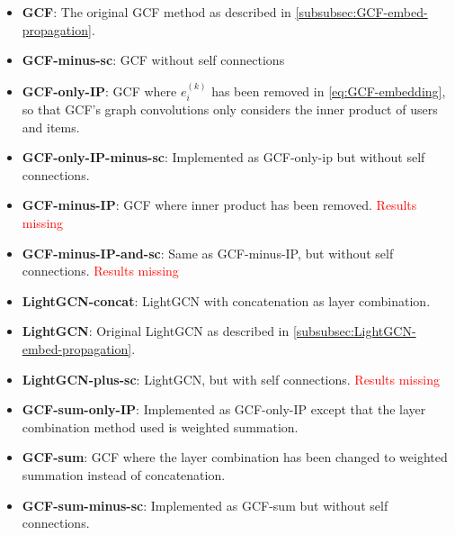 \begin{itemize}
    \item \textbf{GCF}: The original GCF method as described in \autoref{subsubsec:GCF-embed-propagation}.
    \item \textbf{GCF-minus-sc}: GCF without self connections
    \item \textbf{GCF-only-IP}:  GCF where $e_i^{(k)}$ has been removed in \autoref{eq:GCF-embedding}, so that GCF's graph convolutions only considers the inner product of users and items.
    \item \textbf{GCF-only-IP-minus-sc}: Implemented as GCF-only-ip but without self connections.
    \item \textbf{GCF-minus-IP}: GCF where inner product has been removed. \textcolor{red}{Results missing}
    \item \textbf{GCF-minus-IP-and-sc}: Same as GCF-minus-IP, but without self connections. \textcolor{red}{Results missing}
    \item \textbf{LightGCN-concat}: LightGCN with concatenation as layer combination.
    \item \textbf{LightGCN}: Original LightGCN as described in \autoref{subsubsec:LightGCN-embed-propagation}.
    \item \textbf{LightGCN-plus-sc}: LightGCN, but with self connections. \textcolor{red}{Results missing}
    \item \textbf{GCF-sum-only-IP}: Implemented as GCF-only-IP except that the layer combination method used is weighted summation.
    \item \textbf{GCF-sum}: GCF where the layer combination has been changed to weighted summation instead of concatenation.
    \item \textbf{GCF-sum-minus-sc}: Implemented as GCF-sum but without self connections.
\end{itemize}
